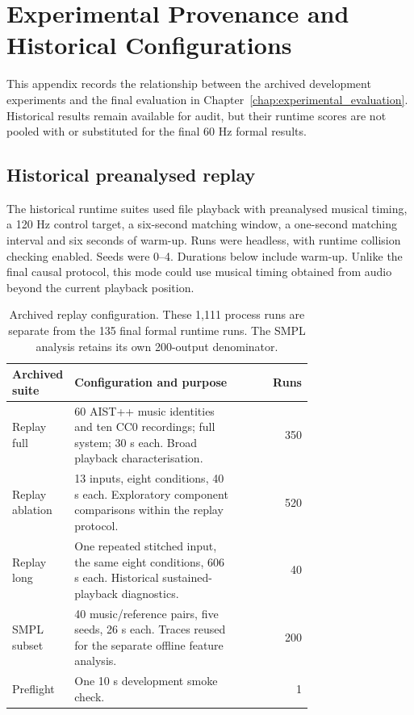 \chapter{Experimental Provenance and Historical Configurations}
\label{app:experiment_provenance}

This appendix records the relationship between the archived development
experiments and the final evaluation in Chapter~\ref{chap:experimental_evaluation}.
Historical results remain available for audit, but their runtime scores are
not pooled with or substituted for the final 60 Hz formal results.

\section{Historical preanalysed replay}

The historical runtime suites used file playback with preanalysed musical
timing, a 120 Hz control target, a six-second matching window, a one-second
matching interval and six seconds of warm-up. Runs were headless, with runtime
collision checking enabled. Seeds were 0--4. Durations below include warm-up.
Unlike the final causal protocol, this mode could use musical timing obtained
from audio beyond the current playback position.

\begin{table}[htbp]
\centering\small
\begin{tabular}{p{0.18\linewidth}p{0.56\linewidth}r}
\toprule
Archived suite & Configuration and purpose & Runs \\
\midrule
Replay full & 60 AIST++ music identities and ten CC0 recordings;
full system; 30 s each. Broad playback characterisation. & 350 \\
Replay ablation & 13 inputs, eight conditions, 40 s each.
Exploratory component comparisons within the replay protocol. & 520 \\
Replay long & One repeated stitched input, the same eight conditions,
606 s each. Historical sustained-playback diagnostics. & 40 \\
SMPL subset & 40 music/reference pairs, five seeds, 26 s each.
Traces reused for the separate offline feature analysis. & 200 \\
Preflight & One 10 s development smoke check. & 1 \\
\bottomrule
\end{tabular}
\caption{Archived replay configuration. These 1,111 process runs are separate
from the 135 final formal runtime runs. The SMPL analysis retains its own
200-output denominator.}
\label{tab:app_replay_matrix}
\end{table}

